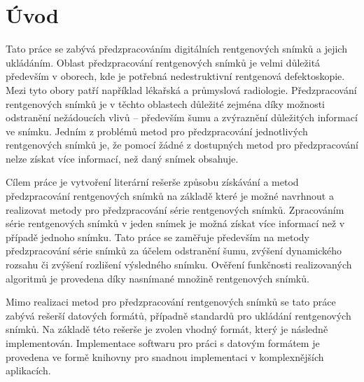\chapter*{Úvod} 
{} 
Tato práce se zabývá předzpracováním digitálních rentgenových snímků a jejich ukládáním. Oblast předzpracování rentgenových snímků je velmi důležitá především v oborech, kde je potřebná nedestruktivní rentgenová defektoskopie. Mezi tyto obory patří například lékařská a průmyslová radiologie. Předzpracování rentgenových snímků je v těchto oblastech důležité zejména díky možnosti odstranění nežádoucích vlivů -- především šumu a zvýraznění důležitých informací ve snímku. Jedním z problémů metod pro předzpracování jednotlivých rentgenových snímků je, že pomocí žádné z dostupných metod pro předzpracování nelze získat více informací, než daný snímek obsahuje.

Cílem práce je vytvoření literární rešerše způsobu získávání a metod předzpracování rentgenových snímků na základě které je možné navrhnout a realizovat metody pro předzpracování série rentgenových snímků. Zpracováním série rentgenových snímků v jeden snímek je možná získat více informací než v případě jednoho snímku. Tato práce se zaměřuje především na metody předzpracování série snímků za účelem odstranění šumu, zvýšení dynamického rozsahu či zvýšení rozlišení výsledného snímku. Ověření funkčnosti realizovaných algoritmů je provedena díky nasnímané množině rentgenových snímků.

Mimo realizaci metod pro předzpracování rentgenových snímků se tato práce zabývá rešerší datových formátů, případně standardů pro ukládání rentgenových snímků. Na základě této rešerše je zvolen vhodný formát, který je následně implementován. Implementace softwaru pro práci s datovým formátem je provedena ve formě knihovny pro snadnou implementaci v komplexnějších aplikacích.